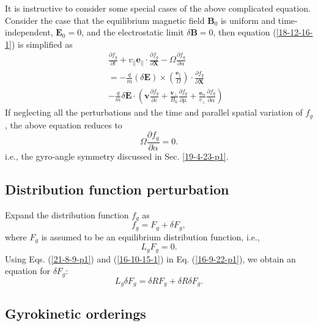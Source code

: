 \documentclass{llncs}
\newcommand{\tmmathbf}[1]{\ensuremath{\boldsymbol{#1}}}
\begin{document}
It is instructive to consider some special cases of the above complicated
equation. Consider the case that the equilibrium magnetic field $\mathbf{B}_0$
is uniform and time-independent, $\mathbf{E}_0 = 0$, and the electrostatic
limit $\delta \mathbf{B}= 0$, then equation (\ref{18-12-16-1}) is simplified
as
\begin{eqnarray}
  &  & \frac{\partial f_g}{\partial t} + v_{\parallel} \mathbf{e}_{\parallel}
  \cdot \frac{\partial f_g}{\partial \mathbf{X}} - \Omega \frac{\partial
  f_g}{\partial \alpha} \nonumber\\
  &  & = - \frac{q}{m} (\delta \mathbf{E}) \times \left(
  \frac{\tmmathbf{e}_{\parallel}}{\Omega}  \right) \cdot \frac{\partial
  f_g}{\partial \mathbf{X}} \\
  &  & - \frac{q}{m} \delta \mathbf{E} \cdot \left( \mathbf{v} \frac{\partial
  f_g}{\partial \varepsilon} + \frac{\mathbf{v}_{\perp}}{B_0}  \frac{\partial
  f_g}{\partial \mu} + \frac{\tmmathbf{e}_{\alpha}}{v_{\perp}}  \frac{\partial
  f_g}{\partial \alpha} \right) 
\end{eqnarray}
If neglecting all the perturbations and the time and parallel spatial
variation of $f_g$, the above equation reduces to
\begin{equation}
  \Omega \frac{\partial f_g}{\partial \alpha} = 0.
\end{equation}
i.e., the gyro-angle symmetry discussed in Sec. \ref{19-4-23-p1}.

\subsection{Distribution function perturbation}

Expand the distribution function $f_g$ as
\begin{equation}
  \label{21-8-9-p1} f_g = F_g + \delta F_g,
\end{equation}
where $F_g$ is assumed to be an equilibrium distribution function, i.e.,
\begin{equation}
  \label{16-10-15-1} L_g F_g = 0.
\end{equation}
Using Eqs. (\ref{21-8-9-p1}) and (\ref{16-10-15-1}) in Eq. (\ref{16-9-22-p1}),
we obtain an equation for $\delta F_g$:
\begin{equation}
  \label{16-9-23-p1} L_g \delta F_g = \delta R F_g + \delta R \delta F_g .
\end{equation}

\subsection{Gyrokinetic orderings}
\end{document}
